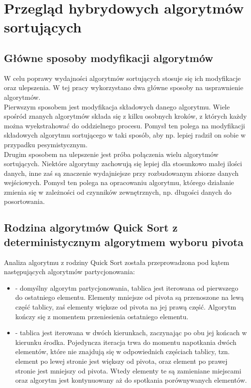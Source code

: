 \chapter{Przegląd hybrydowych algorytmów sortujących}
\thispagestyle{chapterBeginStyle}

\section{Główne sposoby modyfikacji algorytmów}
W celu poprawy wydajności algorytmów sortujących stosuje się ich modyfikacje oraz ulepszenia. W tej pracy wykorzystano dwa główne sposoby na usprawnienie algorytmów.\\

Pierwszym sposobem jest modyfikacja składowych danego algorytmu. Wiele spośród znanych algorytmów składa się z kilku osobnych kroków, z których każdy można wyekstrahować do oddzielnego procesu. Pomysł ten polega na modyfikacji składowych algorytmu sortującego w taki sposób, aby np. lepiej radził on sobie w przypadku pesymistycznym.\\

Drugim sposobem na ulepszenie jest próba połączenia wielu algorytmów sortujących. Niektóre algorytmy zachowują się lepiej dla stosunkowo małej ilości danych, inne zaś są znaczenie wydajniejsze przy rozbudowanym zbiorze danych wejściowych. Pomysł ten polega na opracowaniu algorytmu, którego działanie zmienia się w zależności od czynników zewnętrznych, np. długości danych do posortowania.\\

\section{Rodzina algorytmów Quick Sort z deterministycznym algorytmem wyboru pivota}
Analiza algorytmu z rodziny Quick Sort została przeprowadzona pod kątem następujących algorytmów partycjonowania:
\begin{itemize}
	\setlength\itemsep{0em}
	\item {} - domyślny algorytm partycjonowania, tablica jest iterowana od pierwszego do ostatniego elementu. Elementy mniejsze od pivota są przenoszone na lewą część tablicy, zaś elementy większe od pivota na jej prawą część. Algorytm kończy się z momentem przeniesienia ostatniego elementu.
	\item {} - tablica jest iterowana w dwóch kierunkach, zaczynając po obu jej końcach w kierunku środka. Pojedyncza iteracja trwa do momentu napotkania dwóch elementów, które nie znajdują się w odpowiednich częściach tablicy, tzn. element po lewej stronie jest większy od pivota, oraz element po prawej stronie jest mniejszy od pivota. Wtedy elementy te są zamieniane miejscami oraz algorytm jest kontynuowany aż do spotkania porównywanych elementów.
\end{itemize}

